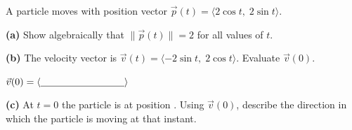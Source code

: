 \documentclass[10pt]{article}
\begin{document}
\begin{tcolorbox}[colback=white, colframe=black!40,
    title=\textbf{Tier E --- Extend},
    fonttitle=\bfseries, arc=2mm, left=3mm, right=3mm, top=2mm, bottom=2mm]
\small

A particle moves with position vector $\vec{p}(t)=\langle 2\cos t,\;2\sin t\rangle$.

\vspace{0.06in}
\textbf{(a)} Show algebraically that $\|\vec{p}(t)\|=2$ for all values of $t$.


\vspace{0.06in}
\textbf{(b)} The velocity vector is $\vec{v}(t)=\langle -2\sin t,\;2\cos t\rangle$.
Evaluate $\vec{v}(0)$.

\vspace{0.06in}
\hspace{1em} $\vec{v}(0) = \langle \blank{3cm}\rangle$

\vspace{0.06in}
\textbf{(c)} At $t=0$ the particle is at position \blank{2.5cm}.
Using $\vec{v}(0)$, describe the direction in which the particle is moving at that instant.


\end{tcolorbox}
\end{document}
